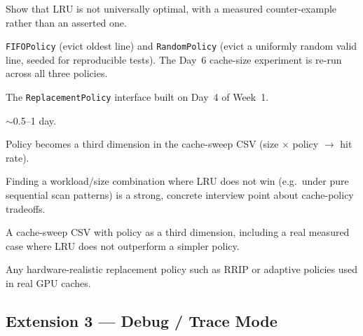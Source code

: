 \documentclass[11pt]{article}
\begin{document}
\begin{description}[leftmargin=1.2cm]
  \item[Purpose] Show that LRU is not universally optimal, with a measured
  counter-example rather than an asserted one.
  \item[Implementation] \texttt{FIFOPolicy} (evict oldest line) and
  \texttt{RandomPolicy} (evict a uniformly random valid line, seeded for
  reproducible tests). The Day~6 cache-size experiment is re-run across
  all three policies.
  \item[Dependencies] The \texttt{ReplacementPolicy} interface built on
  Day~4 of Week~1.
  \item[Estimated effort] $\sim$0.5--1 day.
  \item[Design notes] Policy becomes a third dimension in the cache-sweep
  CSV (size $\times$ policy $\to$ hit rate).
  \item[Why it matters] Finding a workload/size combination where LRU does
  not win (e.g.\ under pure sequential scan patterns) is a strong,
  concrete interview point about cache-policy tradeoffs.
  \item[Proof of done] A cache-sweep CSV with policy as a third dimension,
  including a real measured case where LRU does not outperform a simpler
  policy.
  \item[Does not claim] Any hardware-realistic replacement policy such as
  RRIP or adaptive policies used in real GPU caches.
\end{description}

\subsection{Extension 3 --- Debug / Trace Mode}
\end{document}
